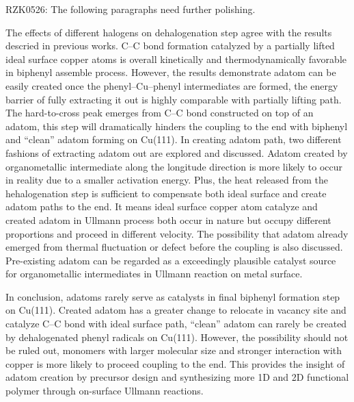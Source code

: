 \documentclass[%
 reprint,
 amsmath,amssymb,
 aps,
prb,
floatfix,
]{revtex4-2}
\newcommand{\comm}{\color{Purple}} %
\begin{document}
{\comm RZK0526: The following paragraphs need further polishing.

The effects of different halogens on dehalogenation step agree with the results descried in previous works. C--C bond formation catalyzed by a partially lifted ideal surface copper atoms is overall kinetically and thermodynamically favorable in biphenyl assemble process. However, the results demonstrate adatom can be easily created once the phenyl--Cu--phenyl intermediates are formed, the energy barrier of fully extracting it out is highly comparable with partially lifting path. The hard-to-cross peak emerges from C--C bond constructed on top of an adatom, this step will dramatically hinders the coupling to the end with biphenyl and ``clean'' adatom forming on Cu(111). In creating adatom path, two different fashions of extracting adatom out are explored and discussed. Adatom created by organometallic intermediate along the longitude direction is more likely to occur in reality due to a smaller activation energy. Plus, the heat released from the hehalogenation step is sufficient to compensate both ideal surface and create adatom paths to the end. It means ideal surface copper atom catalyze and created adatom in Ullmann process both occur in nature but occupy different proportions and proceed in different velocity.
The possibility that adatom already emerged from thermal fluctuation or defect before the coupling is also discussed. Pre-existing adatom can be regarded as a exceedingly plausible catalyst source for organometallic intermediates in Ullmann reaction on metal surface.

In conclusion, adatoms rarely serve as catalysts in final biphenyl formation step on Cu(111). Created adatom has a greater change to relocate in vacancy site and catalyze C--C bond with ideal surface path, ``clean'' adatom can rarely be created by dehalogenated phenyl radicals on Cu(111). However, the possibility should not be ruled out, monomers with larger molecular size and stronger interaction with copper is more likely to proceed coupling to the end. This provides the insight of adatom creation by precursor design and synthesizing more 1D and 2D functional polymer through on-surface Ullmann reactions.




}
\end{document}
